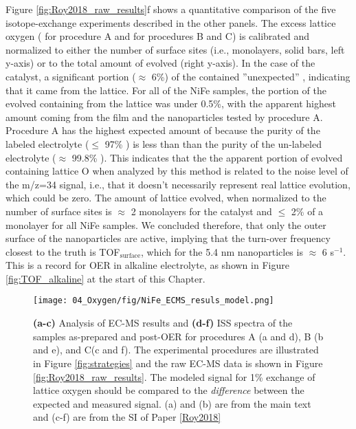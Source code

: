 Figure \ref{fig:Roy2018_raw_results}f shows a quantitative comparison of the five isotope-exchange experiments described in the other panels. The excess lattice oxygen ( for procedure A and  for procedures B and C) is calibrated and normalized to either the number of surface sites (i.e., monolayers, solid bars, left y-axis) or to the total amount of  evolved (right y-axis). In the case of the  catalyst, a significant portion ($\approx$ 6\%) of the  contained ''unexpected'' , indicating that it came from the lattice. For all of the NiFe samples, the portion of the evolved  containing  from the lattice was under 0.5\%, with the apparent highest amount coming from the film and the nanoparticles tested by procedure A. Procedure A has the highest expected amount of  because the purity of the labeled electrolyte ($\le$ 97\% ) is less than than the purity of the un-labeled electrolyte ($\approx$ 99.8\% ). This indicates that the the apparent portion of evolved  containing lattice O when analyzed by this method is related to the noise level of the m/z=34 signal, i.e., that it doesn't necessarily represent real lattice  evolution, which could be zero. The amount of lattice  evolved, when normalized to the number of surface sites is $\approx$ 2 monolayers for the  catalyst and $\le$ 2\% of a monolayer for all NiFe samples. We concluded therefore, that only the outer surface of the nanoparticles are active, implying that the turn-over frequency closest to the truth is TOF$_{\text{surface}}$, which for the 5.4 nm nanoparticles is $\approx$ 6 s$^{-1}$. This is a record for OER in alkaline electrolyte, as shown in Figure \ref{fig:TOF_alkaline} at the start of this Chapter.

\begin{figure}[h!]
	\centering
	\texttt{[image: 04\_Oxygen/fig/NiFe\_ECMS\_resuls\_model.png]}
	\caption{\textbf{(a-c)} Analysis of EC-MS results and \textbf{(d-f)} ISS spectra of the samples as-prepared and post-OER for procedures A (a and d), B (b and e), and C(c and f). The experimental procedures are illustrated in Figure \ref{fig:strategies} and the raw EC-MS data is shown in Figure \ref{fig:Roy2018_raw_results}. The modeled signal for 1\% exchange of lattice oxygen should be compared to the \textit{difference} between the expected and measured  signal. (a) and (b) are from the main text and (c-f) are from the SI of Paper \ref{Roy2018}}
	\label{fig:Roy2018_model}
\end{figure}


